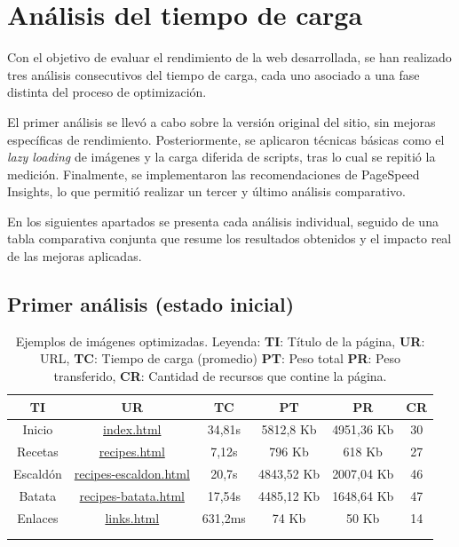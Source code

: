 \documentclass{article}
\begin{document}
\newpage

\section{Análisis del tiempo de carga}\label{sec:analisis-de-tiempo-de-carga}

Con el objetivo de evaluar el rendimiento de la web desarrollada, se han realizado tres análisis consecutivos del tiempo de carga, cada uno asociado a una fase distinta del proceso de optimización.

El primer análisis se llevó a cabo sobre la versión original del sitio, sin mejoras específicas de rendimiento. Posteriormente, se aplicaron técnicas básicas como el \textit{lazy loading} de imágenes y la carga diferida de scripts, tras lo cual se repitió la medición. Finalmente, se implementaron las recomendaciones de PageSpeed Insights, lo que permitió realizar un tercer y último análisis comparativo.

En los siguientes apartados se presenta cada análisis individual, seguido de una tabla comparativa conjunta que resume los resultados obtenidos y el impacto real de las mejoras aplicadas.

\subsection{Primer análisis (estado inicial)}\label{subsec:primer-analisis}

\begin{longtable}{c|c|c|c|c|c}
    \hline
    \textbf{TI} & \textbf{UR} & \textbf{TC} & \textbf{PT} & \textbf{PR} & \textbf{CR} \\
    \endhead
    \hline
    Inicio & \href{https://www.danielramos.me/hhyc-dramosac/index.html}{index.html} & 34,81s & 5812,8 Kb & 4951,36 Kb & 30 \\
    Recetas & \href{https://www.danielramos.me/hhyc-dramosac/recipes.html}{recipes.html} & 7,12s & 796 Kb & 618 Kb & 27 \\
    Escaldón & \href{https://www.danielramos.me/hhyc-dramosac/recipes-escaldon.html}{recipes-escaldon.html} & 20,7s & 4843,52 Kb & 2007,04 Kb & 46 \\
    Batata & \href{https://www.danielramos.me/hhyc-dramosac/recipes-batata.html}{recipes-batata.html} & 17,54s & 4485,12 Kb & 1648,64 Kb & 47 \\
    Enlaces & \href{https://www.danielramos.me/hhyc-dramosac/links.html}{links.html} & 631,2ms & 74 Kb & 50 Kb & 14 \\
    \hline
     \\[1.5ex]
     \caption{
          Ejemplos de imágenes optimizadas.
          Leyenda: 
          \textbf{TI}: Título de la página, 
          \textbf{UR}: URL, 
          \textbf{TC}: Tiempo de carga (promedio) 
          \textbf{PT}: Peso total 
          \textbf{PR}: Peso transferido, 
          \textbf{CR}: Cantidad de recursos que contine la página.
     }
    \label{tab:imagenes-optimizadas}
\end{longtable}
\end{document}
